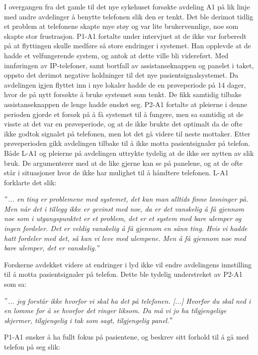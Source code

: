 \noindent
I overgangen fra det gamle til det nye sykehuset forsøkte avdeling A1 på lik linje med andre avdelinger å benytte telefonen slik den er tenkt. Det ble derimot tidlig et problem at telefonene skapte mye støy og var lite brukervennlige, noe som skapte stor frustrasjon. P1-A1 fortalte under intervjuet at de ikke var forberedt på at flyttingen skulle medføre så store endringer i systemet. Han opplevde at de hadde et velfungerende system, og antok at dette ville bli videreført. Med innføringen av IP-telefoner, samt bortfall av assistanseknappen og panelet i taket, oppsto det derimot negative holdninger til det nye pasientsignalsystemet. Da avdelingen igjen flyttet inn i nye lokaler hadde de en prøveperiode på 14 dager, hvor de på nytt forsøkte å bruke systemet som tenkt. De fikk samtidig tilbake assistanseknappen de lenge hadde ønsket seg. P2-A1 fortalte at pleierne i denne perioden gjorde et forsøk på å få systemet til å fungere, men sa samtidig at de visste at det var en prøveperiode, og at de ikke brukte det optimalt da de ofte ikke godtok signalet på telefonen, men lot det gå videre til neste mottaker. Etter prøveperioden gikk avdelingen tilbake til å ikke motta pasientsignaler på telefon. Både L-A1 og pleierne på avdelingen uttrykte tydelig at de ikke ser nytten av slik bruk. De argumenterer med at de like gjerne kan se på panelene, og at de ofte står i situasjoner hvor de ikke har mulighet til å håndtere telefonen. L-A1 forklarte det slik: 

\noindent
\textit{$"$... en ting er problemene med systemet, det kan man alltids finne løsninger på. Men når det i tillegg ikke er gevinst med noe, da er det vanskelig å få gjennom noe som i utgangspunktet er et problem, det er et system med bare ulemper og ingen fordeler. Det er veldig vanskelig å få gjennom en sånn ting. Hvis vi hadde hatt fordeler med det, så kan vi leve med ulempene. Men å få gjennom noe med bare ulemper, det er vanskelig.$"$}

\noindent
Forskerne avdekket videre at endringer i lyd ikke vil endre avdelingens innstilling til å motta pasientsignaler på telefon. Dette ble tydelig understreket av P2-A1 som sa:

\noindent
\textit{$"$... jeg forstår ikke hvorfor vi skal ha det på telefonen. [...] Hvorfor du skal ned i en lomme for å se hvorfor det ringer liksom. Da må vi jo ha tilgjengelige skjermer, tilgjengelig i tak som sagt, tilgjengelig panel.$"$}

\noindent
P1-A1 ønsker å ha fullt fokus på pasientene, og beskrev sitt forhold til å gå med telefon på seg slik:

